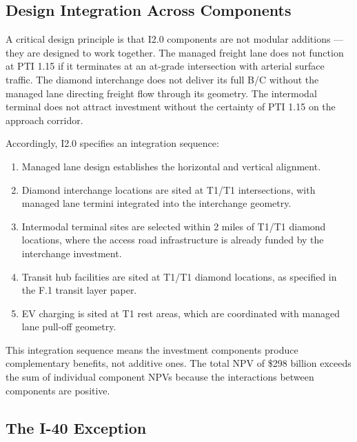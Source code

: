 \subsection{Design Integration Across Components}

A critical design principle is that I2.0 components are not modular additions --- they are designed to work together. The managed freight lane does not function at PTI 1.15 if it terminates at an at-grade intersection with arterial surface traffic. The diamond interchange does not deliver its full B/C without the managed lane directing freight flow through its geometry. The intermodal terminal does not attract investment without the certainty of PTI 1.15 on the approach corridor.

Accordingly, I2.0 specifies an integration sequence:
\begin{enumerate}
  \item Managed lane design establishes the horizontal and vertical alignment.
  \item Diamond interchange locations are sited at T1/T1 intersections, with managed lane termini integrated into the interchange geometry.
  \item Intermodal terminal sites are selected within 2 miles of T1/T1 diamond locations, where the access road infrastructure is already funded by the interchange investment.
  \item Transit hub facilities are sited at T1/T1 diamond locations, as specified in the F.1 transit layer paper.
  \item EV charging is sited at T1 rest areas, which are coordinated with managed lane pull-off geometry.
\end{enumerate}

This integration sequence means the investment components produce complementary benefits, not additive ones. The total NPV of \$298 billion exceeds the sum of individual component NPVs because the interactions between components are positive.

\subsection{The I-40 Exception}

